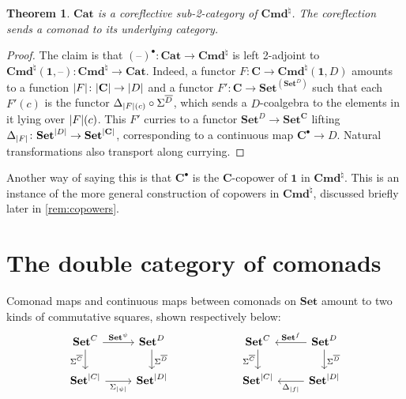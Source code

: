 \documentclass[11pt, oneside, article]{memoir}
\theoremstyle{plain}
\newtheorem{theorem}{Theorem}[section]
\theoremstyle{definition}
\theoremstyle{remark}
\DeclarePairedDelimiter{\abs}{\lvert}{\rvert}
\newcommand{\dash}{{\mathord{\text{--}}}}
\newcommand{\namedcat}[1]{\mathbf{#1}}
\newcommand{\cat}[1]{\mathbf{#1}}
\newcommand{\Set}{\namedcat{Set}}
\newcommand{\Cat}{\namedcat{Cat}}
\newcommand{\Con}{\namedcat{Cmd}^\natural}
\newcommand{\ConSet}{\Con}
\newcommand{\CoalgOn}[2]{{#2}^{#1}}
\newcommand{\CoalgSet}[1]{\CoalgOn{#1}{\Set}}
\newcommand{\clift}[1]{\overline{#1}}
\newcommand{\pts}[1]{{\abs{#1}}}
\newcommand{\obs}[1]{\pts{#1}}
\newcommand{\one}[1]{\pts{#1}}
\newcommand{\carr}{\Sigma}
\newcommand{\leindex}[1]{\Sigma_{#1}}
\newcommand{\reindex}[1]{\Delta_{#1}}
\newcommand{\point}{\mathbf{1}}
\newcommand{\car}[1]{\carr^{#1}}
\newcommand{\com}[2]{{#1}^{#2}}
\newcommand{\con}[2]{{#1}^{#2}}
\newcommand{\fun}[2]{{#2}^{#1}}
\newcommand{\Ho}[1]{#1}
\newcommand{\cmnd}[1]{{#1}}
\newcommand{\cC}{\cmnd{C}}
\newcommand{\cD}{\cmnd{D}}
\newcommand{\bC}{\cat{C}}
\newcommand{\cbC}{\cattocmd{\bC}}
\newcommand{\CSet}{\CoalgSet{\cC}}
\newcommand{\DSet}{\CoalgSet{\cD}}
\newcommand{\SetpC}{\Set^\pts{\cC}}
\newcommand{\SetpD}{\Set^\pts{\cD}}
\newcommand{\cattocmd}[1]{{{#1}^\bullet}}
\newcommand{\pointcmd}{\point}
\begin{document}
\begin{theorem}\label{thm:catcoreflection}
  $\Cat$ is a coreflective sub-2-category of $\ConSet$. The
  coreflection sends a comonad to its underlying category.
\end{theorem}
\begin{proof}
  The claim is that $\cattocmd{(\dash)} \colon \Cat \to \ConSet$ is
  left 2-adjoint to
  $\Ho{\ConSet}(\pointcmd, \dash) \colon \ConSet \to \Cat$. Indeed, a
  functor $F \colon \bC \to \Ho{\ConSet}(\pointcmd, \cD)$ amounts to a
  function $\obs{F} \colon \obs{\bC} \to \pts{\cD}$ and a functor
  $F' \colon \bC \to \fun{(\DSet)}{\Set}$ such that each
  $F'(c)$ is the functor
  $\reindex{\obs{F}(c)} \circ \car{\clift{\cD}}$, which sends a
  $\cD$-coalgebra to the elements in it lying over $\obs{F}(c)$. This
  $F'$ curries to a functor $\DSet \to \fun{\bC}{\Set}$ lifting
  $\reindex{\obs{F}} \colon \SetpD \to \fun{\obs{\bC}}{\Set}$,
  corresponding to a continuous map $\cbC \to \cD$. Natural
  transformations also transport along currying.
\end{proof}

Another way of saying this is that $\cbC$ is the
$\bC$-copower of $\pointcmd$ in $\ConSet$. This is an instance of the
more general construction of copowers in $\ConSet$, discussed briefly
later in \cref{rem:copowers}.

\section{The double category of comonads}\label{sec:doubleset}

Comonad maps and continuous maps between comonads on $\Set$ amount to two kinds of commutative
squares, shown respectively below:
\[
  \begin{tikzcd}
    \CSet & \DSet \\
    {\SetpC} & {\SetpD}
    \arrow["{\com{\Set}{\psi}}", from=1-1, to=1-2]
    \arrow["{\car{\clift{\cC}}}"', from=1-1, to=2-1]
    \arrow["{\car{\clift{\cD}}}", from=1-2, to=2-2]
    \arrow["{\leindex{\one{\psi}}}"', from=2-1, to=2-2]
  \end{tikzcd}
  \qquad\qquad\qquad
  \begin{tikzcd}
    \CSet & \DSet \\
    {\SetpC} & {\SetpD}
    \arrow["{\car{\clift{\cC}}}"', from=1-1, to=2-1]
    \arrow["{\con{\Set}{f}}"', from=1-2, to=1-1]
    \arrow["{\car{\clift{\cD}}}", from=1-2, to=2-2]
    \arrow["{\reindex{\one{f}}}", from=2-2, to=2-1]
  \end{tikzcd}
\]
\end{document}
